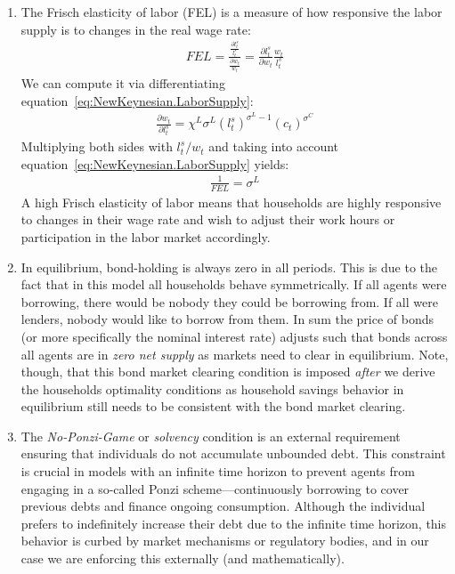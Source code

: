 \begin{enumerate}
\item
The Frisch elasticity of labor (FEL) is a measure of how responsive the labor supply is to changes in the real wage rate:
\begin{align*}
FEL = \frac{\frac{\partial{l^{s}_{t}}}{l^{s}_{t}}}{\frac{\partial{w_{t}}}{w_{t}}} = \frac{\partial l^{s}_{t}}{\partial w_{t}} \frac{w_{t}}{l^{s}_{t}}
\end{align*}
We can compute it via differentiating equation~\eqref{eq:NewKeynesian.LaborSupply}:
\begin{align*}
\frac{\partial w_{t}}{\partial l^{s}_{t}} = \chi^{L} \sigma^{L} {(l^{s}_{t})}^{\sigma^{L}-1} {(c_{t})}^{\sigma^{C}}
\end{align*}
Multiplying both sides with \(l^{s}_{t}/w_{t}\) and taking into account equation~\eqref{eq:NewKeynesian.LaborSupply} yields:
\begin{align*}
\frac{1}{FEL} = \sigma^{L} 
\end{align*}
A high Frisch elasticity of labor means that households are highly responsive to changes in their wage rate 
  and wish to adjust their work hours or participation in the labor market accordingly.

\item In equilibrium, bond-holding is always zero in all periods.
This is due to the fact that in this model all households behave symmetrically.
If all agents were borrowing, there would be nobody they could be borrowing from.
If all were lenders, nobody would like to borrow from them.
In sum the price of bonds (or more specifically the nominal interest rate) adjusts such
  that bonds across all agents are in \emph{zero net supply} as markets need to clear in equilibrium.
Note, though, that this bond market clearing condition is imposed
  \emph{after} we derive the households optimality conditions
  as household savings behavior in equilibrium still needs to be consistent with the bond market clearing.

\item
The \emph{No-Ponzi-Game} or \emph{solvency} condition is an external requirement
  ensuring that individuals do not accumulate unbounded debt.
This constraint is crucial in models with an infinite time horizon
  to prevent agents from engaging in a so-called Ponzi scheme---continuously borrowing to cover previous debts
  and finance ongoing consumption.
Although the individual prefers to indefinitely increase their debt due to the infinite time horizon,
  this behavior is curbed by market mechanisms or regulatory bodies,
  and in our case we are enforcing this externally (and mathematically).


\end{enumerate}
